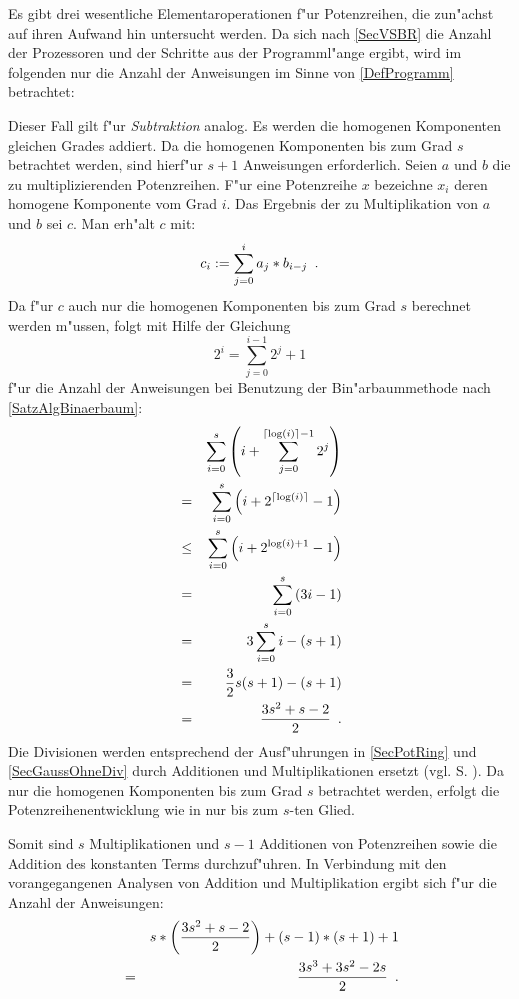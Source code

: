Es gibt drei wesentliche Elementaroperationen f"ur Potenzreihen, die 
zun"achst auf ihren Aufwand hin untersucht werden. Da sich nach
\ref{SecVSBR} die Anzahl der Prozessoren und der Schritte aus der
Programml"ange ergibt, wird im folgenden nur die Anzahl der Anweisungen
im Sinne von \ref{DefProgramm} betrachtet:
\begin{MyDescription}
    Dieser Fall gilt f"ur {\em Subtraktion} analog. Es werden die
    homogenen Komponenten gleichen Grades addiert. Da die homogenen 
    Komponenten bis zum Grad $s$ betrachtet werden, sind hierf"ur 
    $s+1$ Anweisungen erforderlich.
    Seien $a$ und $b$ die zu multiplizierenden Potenzreihen. F"ur eine
    Potenzreihe $x$ bezeichne $x_i$ deren homogene Komponente vom
    Grad $i$. Das Ergebnis der zu Multiplikation von $a$ und $b$ sei $c$.
    Man erh"alt $c$ mit:
    \[ c_i := \sum_{j=0}^{i} a_j * b_{i-j} \mbox{\hspace{0.5em}.} \]
    Da f"ur $c$ auch nur die homogenen Komponenten bis zum
    Grad $s$ berechnet werden m"ussen, folgt mit Hilfe der Gleichung
    \[ 2^i = \sum_{j=0}^{i-1} 2^j + 1 \] f"ur die Anzahl der Anweisungen
    bei Benutzung der Bin"arbaummethode nach \ref{SatzAlgBinaerbaum}:
    \begin{eqnarray*}
        & & \sum_{i=0}^s 
            \left( 
                i + \sum_{j=0}^{\left\lceil \log(i) \right\rceil-1} 2^j 
            \right) \\
        & = &
            \sum_{i=0}^s \left( i + 2^{\left\lceil \log(i) \right\rceil} - 1 \right) \\
        & \leq &
            \sum_{i=0}^s \left( i + 2^{\log(i) + 1} - 1 \right) \\
        & = &
            \sum_{i=0}^s \left( 3i - 1 \right) \\
        & = & 3 \sum_{i=0}^s i - (s+1) \\
        & = & \frac{3}{2} s (s + 1) - (s+1) \\
        & = & \frac{3s^2 + s - 2}{2} \mbox{\hspace{0.5em}.}
    \end{eqnarray*}
    Die Divisionen werden entsprechend der Ausf"uhrungen in
    \ref{SecPotRing} und \ref{SecGaussOhneDiv} durch Additionen und
     Multiplikationen ersetzt (vgl. S. \pageref{Equ1ZuErsetzen}).
    Da nur die homogenen Komponenten bis zum Grad $s$ betrachtet werden,
    erfolgt die Potenzreihenentwicklung wie in 
    nur bis zum $s$-ten Glied.

    Somit sind
    $s$ Multiplikationen und $s-1$ Additionen von Potenzreihen sowie
    die Addition des konstanten Terms durchzuf"uhren. In Verbindung mit
    den vorangegangenen Analysen von Addition und Multiplikation ergibt
    sich f"ur die Anzahl der Anweisungen:
    \begin{eqnarray*}
        &   & s * \left( \frac{3s^2 + s - 2}{2} \right) + (s-1) * (s+1) + 1 \\
        & = & \frac{3s^3 + 3s^2 - 2s}{2} \mbox{\hspace{0.5em}.}
    \end{eqnarray*}
\end{MyDescription}


